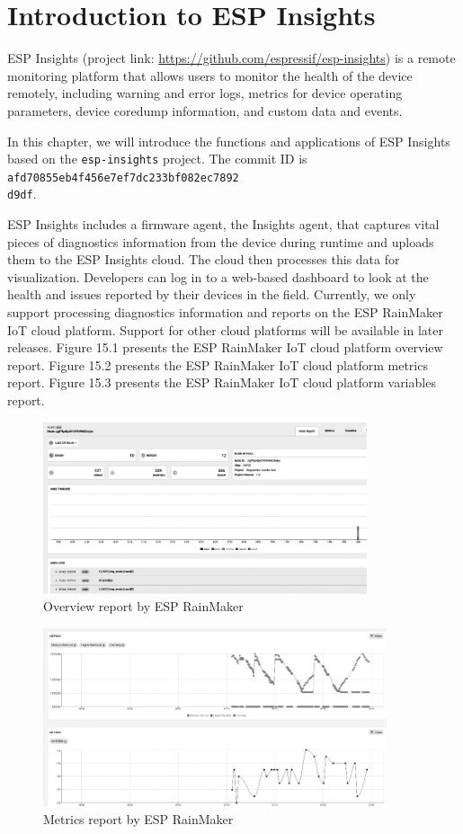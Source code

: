 \documentclass[a4paper,12pt,openany]{book}
\begin{document}
\section{Introduction to ESP Insights}
ESP Insights (project link: \url{https://github.com/espressif/esp-insights}) is a remote monitoring platform that allows users to monitor the health of the device remotely, including warning and error logs, metrics for device operating parameters, device coredump information, and custom data and events.

In this chapter, we will introduce the functions and applications of ESP Insights based on the \verb|esp-insights| project. The commit ID is \verb|afd70855eb4f456e7ef7dc233bf082ec7892|\\ \verb|d9df|.

ESP Insights includes a firmware agent, the Insights agent, that captures vital pieces of diagnostics information from the device during runtime and uploads them to the ESP Insights cloud. The cloud then processes this data for visualization. Developers can log in to a web-based dashboard to look at the health and issues reported by their devices in the field. Currently, we only support processing diagnostics information and reports on the ESP RainMaker IoT cloud platform. Support for other cloud platforms will be available in later releases. Figure 15.1 presents the ESP RainMaker IoT cloud platform overview report. Figure 15.2 presents the ESP RainMaker IoT cloud platform metrics report. Figure 15.3 presents the ESP RainMaker IoT cloud platform variables report.

\begin{figure}[!h]
    \centering
    \includegraphics[width=0.85\textwidth]{D15Z/15-1}
    \caption{Overview report by ESP RainMaker}
\end{figure}

\begin{figure}[!h]
    \centering
    \includegraphics[width=0.9\textwidth]{D15Z/15-2}
    \caption{Metrics report by ESP RainMaker}
\end{figure}
\end{document}
